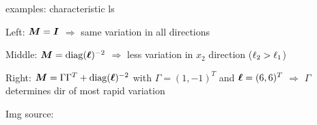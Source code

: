 \documentclass[11pt,compress,t,notes=noshow, xcolor=table]{beamer}
\begin{document}
\begin{framei}{examples: characteristic ls}
\item Left: $\bm{M} = \bm{I}$ $\Rightarrow$ same variation in all directions
\item Middle: $\bm{M} = \operatorname{diag}(\bm{\ell})^{-2}$ $\Rightarrow$ less variation in $x_2$ direction ($\ell_2 > \ell_1$)
\item Right: $\bm{M} = \Gamma \Gamma^T + \operatorname{diag}(\bm{\ell})^{-2}$ with $\Gamma = (1, -1)^T$ and $\bm{\ell} = (6, 6)^T$ $\Rightarrow$ $\Gamma$ determines dir of most rapid variation
\vfill
{}
\item Img source: 
\end{framei}







\end{document}
